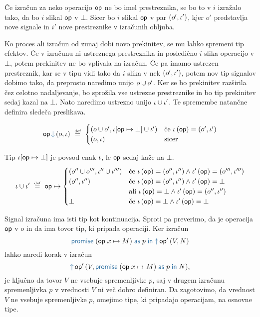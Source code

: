 Če izračun za neko operacijo $\mathsf{op}$ ne bo imel prestreznika, se bo to v $i$ izražalo tako, da bo $i$ slikal $\mathsf{op}$ v $\bot$. 
Sicer bo $i$ slikal $\mathsf{op}$ v par $(o', \iota')$, kjer $o'$ predstavlja nove signale in $i'$ nove prestreznike v izračunih obljuba.

Ko proces ali izračun od zunaj dobi novo prekinitev, se mu lahko spremeni tip efektov.
Če v izračunu ni ustreznega prestreznika in posledično $i$ slika operacijo v $\bot$, potem prekinitev ne bo vplivala na izračun.
Če pa imamo ustrezen prestreznik, kar se v tipu vidi tako da $i$ slika v nek $(o',\iota')$, potem nov tip signalov dobimo tako, da preprosto naredimo unijo $o \cup o'$. Ker se bo prekinitev razširila čez celotno nadaljevanje, bo sprožila vse ustrezne prestreznike in bo tip prekinitev sedaj kazal na $\bot$.
Nato naredimo ustrezno unijo $\iota \cup \iota'$.
Te spremembe natančne definira sledeča preslikava.

$$\opincomp{op}{(\o, \i)}~\defeq~
\begin{cases}
	\left(\o \cup \o' , \i[\op \mapsto \bot] \cup \i' \right) & \mbox{če } \i\, (\op) = (\o',\i')\\
	(\o,\i) & \mbox{sicer} 
\end{cases}$$

Tip $\iota[\mathsf{op} \mapsto \bot]$ je povsod enak $\iota$, le $\mathsf{op}$ sedaj kaže na $\bot$.
$$
\iota \cup \iota'
~\mathrel{\overset{\text{\tiny def}}{=}}~
\mathsf{op} \mapsto 
\begin{cases}
	(o'' \cup o''' , \iota'' \cup \iota''') & \mbox{če } \iota\, (\mathsf{op}) = (o'',\iota'') \wedge \iota'\, (\mathsf{op}) = (o''',\iota''') \\
	(o'' , \iota'') & \mbox{če } \iota\, (\mathsf{op}) = (o'',\iota'') \wedge \iota'\, (\mathsf{op}) = \bot \\
	              & \mbox{ali } \iota\, (\mathsf{op}) = \bot \wedge \iota'\, (\mathsf{op}) = (o'',\iota'') \\
	\bot & \mbox{če } \iota\, (\mathsf{op}) = \bot \wedge \iota'\, (\mathsf{op}) = \bot \\
\end{cases}
$$

Signal izračuna ima isti tip kot kontinuacija. Sproti pa preverimo, da je operacija $\mathsf{op}$ v $o$ in da ima tovor tip, ki pripada operaciji.
Ker izračun 
$$ \tmwith{op}{x}{M}{p}{\tmopout{op'}{V}{N}} $$
lahko naredi korak v izračun
$$ \tmopout{op'}{V}{\tmwith{op}{x}{M}{p}{N}}, $$
je ključno da tovor $V$ ne vsebuje spremenljivke $p$, saj v drugem izračunu spremenljivka $p$ v vrednosti $V$ ni več dobro definiran. Da zagotovimo, da vrednost $V$ ne vsebuje spremenljivke $p$, omejimo tipe, ki pripadajo operacijam, na osnovne tipe.

